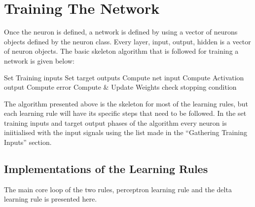 \documentclass[a4paper,12pt]{report}
\begin{document}
\section*{Training The Network}
Once the neuron is defined, a network is defined by using a vector of neurons objects defined by the neuron class. Every layer, input, output, hidden is 
a vector of neuron objects. The basic skeleton algorithm that is followed for training a network is given below:
\begin{algorithm}
 \begin{algorithmic}
  
   \State Set Training inputs
   \State Set target outputs
   \State Compute net input
   \State Compute Activation output
   \State Compute error
   \State Compute \& Update Weights
   \EndFor
   \State check stopping condition
  \EndWhile
 \end{algorithmic}

\end{algorithm}
The algorithm presented above is the skeleton for most of the learning rules, but each learning rule will have its specific steps that need to be followed.
In the set training inputs and target output phases of the algorithm every neuron is iniitialised with the input signals using the list 
made in the ``Gathering Training Inputs'' section. 

\subsection*{Implementations of the Learning Rules}
The main core loop of the two rules, perceptron learning rule and the delta learning rule is presented here.
\end{document}
